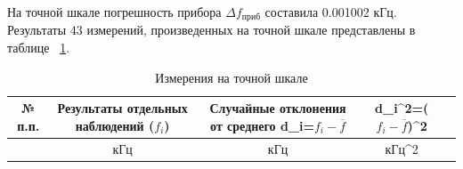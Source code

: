 На точной шкале погрешность прибора $\Delta f_{\text{приб}}$ составила 0.001002 кГц.
Результаты 43 измерений, произведенных на точной шкале представлены в таблице ~\ref{tabl:2}.
\begin{center}
\begin{table}[H]
\centering
\caption{Измерения на точной шкале}
\label{tabl:2}
\begin{tabular}{|c|c|c|c|c|}
\hline
\begin{minipage}{7mm}
    № п.п. 
\end{minipage}&
\begin{minipage}{5cm}
    Результаты отдельных наблюдений ($f_i$)
\end{minipage} &
\begin{minipage}{5cm}
    Случайные отклонения от среднего d_i=$f_i-\overline{f}$
\end{minipage} &
\begin{minipage}{5cm}
   d_i^2=($f_i-$$\overline{f}$)^2
\end{minipage}\\
\hline
{}&кГц&кГц&кГц^2\\
\hline


\end{tabular}
\end{table}
\end{center}
